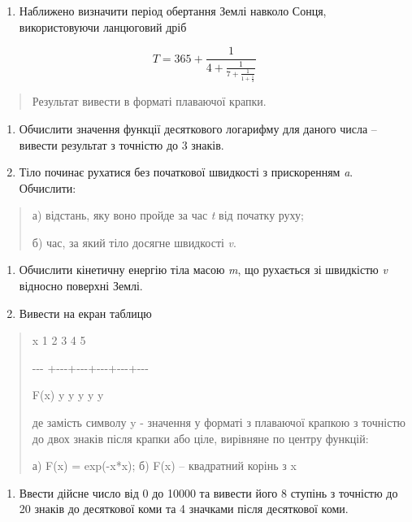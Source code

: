 \documentclass[]{article}
\begin{document}
\begin{enumerate}
\def\labelenumi{\arabic{enumi}.}
\item
  Наближено визначити період обертання Землі навколо Сонця,
  використовуючи ланцюговий дріб
\end{enumerate}

\[T = \mathrm{365} + \frac{1}{4 + \frac{1}{7 + \frac{1}{1 + \frac{1}{3}}}}\]

\begin{quote}
Результат вивести в форматі плаваючої крапки.
\end{quote}

\begin{enumerate}
\def\labelenumi{\arabic{enumi}.}
\item
  Обчислити значення функції десяткового логарифму для даного числа --
  вивести результат з точністю до 3 знаків.
\item
  Тіло починає рухатися без початкової швидкості з прискоренням
  \emph{a}. Обчислити:
\end{enumerate}

\begin{quote}
а) відстань, яку воно пройде за час \emph{t} від початку руху;

б) час, за який тіло досягне швидкості \emph{v}.
\end{quote}

\begin{enumerate}
\def\labelenumi{\arabic{enumi}.}
\item
  Обчислити кінетичну енергію тіла масою \emph{m}, що рухається зі
  швидкістю \emph{v} відносно поверхні Землі.
\item
  Вивести на екран таблицю
\end{enumerate}

\begin{quote}
x \textbar{} 1 \textbar{} 2 \textbar{} 3 \textbar{} 4 \textbar{} 5

-\/-\/- +-\/-\/-+-\/-\/-+-\/-\/-+-\/-\/-+-\/-\/-

F(x)\textbar{} y \textbar{} y \textbar{} y \textbar{} y \textbar{} y

де замість символу y - значення у форматі з плаваючої крапкою з точністю
до двох знаків після крапки або ціле, вирівняне по центру функцій:

а) F(x) = exp(-x*x); б) F(x) -- квадратний корінь з x
\end{quote}

\begin{enumerate}
\def\labelenumi{\arabic{enumi}.}
\item
  Ввести дійсне число від 0 до 10000 та вивести його 8 ступінь з
  точністю до 20 знаків до десяткової коми та 4 значками після
  десяткової коми.
\end{enumerate}
\end{document}
